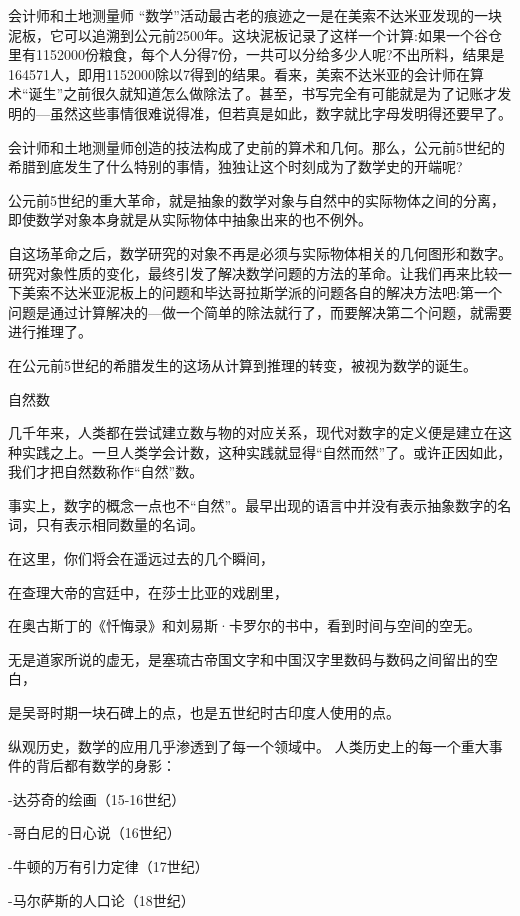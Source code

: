会计师和土地测量师
“数学”活动最古老的痕迹之一是在美索不达米亚发现的一块泥板，它可以追溯到公元前2500年。这块泥板记录了这样一个计算:如果一个谷仓里有1152000份粮食，每个人分得7份，一共可以分给多少人呢?不出所料，结果是164571人，即用1152000除以7得到的结果。看来，美索不达米亚的会计师在算术“诞生”之前很久就知道怎么做除法了。甚至，书写完全有可能就是为了记账才发明的---虽然这些事情很难说得准，但若真是如此，数字就比字母发明得还要早了。

会计师和土地测量师创造的技法构成了史前的算术和几何。那么，公元前5世纪的希腊到底发生了什么特别的事情，独独让这个时刻成为了数学史的开端呢?


公元前5世纪的重大革命，就是抽象的数学对象与自然中的实际物体之间的分离，即使数学对象本身就是从实际物体中抽象出来的也不例外。

自这场革命之后，数学研究的对象不再是必须与实际物体相关的几何图形和数字。研究对象性质的变化，最终引发了解决数学问题的方法的革命。让我们再来比较一下美索不达米亚泥板上的问题和毕达哥拉斯学派的问题各自的解决方法吧:第一个问题是通过计算解决的---做一个简单的除法就行了，而要解决第二个问题，就需要进行推理了。

在公元前5世纪的希腊发生的这场从计算到推理的转变，被视为数学的诞生。


自然数

几千年来，人类都在尝试建立数与物的对应关系，现代对数字的定义便是建立在这种实践之上。一旦人类学会计数，这种实践就显得“自然而然”了。或许正因如此，我们才把自然数称作“自然”数。

事实上，数字的概念一点也不“自然”。最早出现的语言中并没有表示抽象数字的名词，只有表示相同数量的名词。

在这里，你们将会在遥远过去的几个瞬间，

在查理大帝的宫廷中，在莎士比亚的戏剧里，

在奥古斯丁的《忏悔录》和刘易斯·卡罗尔的书中，看到时间与空间的空无。

无是道家所说的虚无，是塞琉古帝国文字和中国汉字里数码与数码之间留出的空白，

是吴哥时期一块石碑上的点，也是五世纪时古印度人使用的点。




纵观历史，数学的应用几乎渗透到了每一个领域中。
人类历史上的每一个重大事件的背后都有数学的身影：

-达芬奇的绘画（15-16世纪）

-哥白尼的日心说（16世纪）

-牛顿的万有引力定律（17世纪）

-马尔萨斯的人口论（18世纪）

